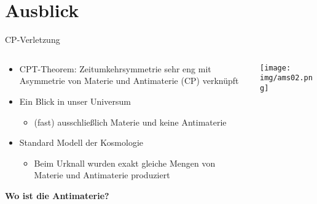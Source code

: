 \section{Ausblick}

\begin{frame}{CP-Verletzung}
    \begin{columns}[T]
        \begin{column}{.6\textwidth}
            \begin{itemize}
                \item CPT-Theorem: Zeitumkehrsymmetrie sehr eng mit Asymmetrie von Materie und Antimaterie (CP) verknüpft
                \item Ein Blick in unser Universum
                \begin{itemize}
                    \item (fast) ausschlie\ss{}lich Materie und keine Antimaterie
                \end{itemize}
                \item Standard Modell der Kosmologie
                \begin{itemize}
                    \item Beim Urknall wurden exakt gleiche Mengen von Materie und Antimaterie produziert
                \end{itemize}
            \end{itemize}
            \centering
            \textbf{Wo ist die Antimaterie?}
        \end{column}
        \begin{column}{.4\textwidth}
            \centering
            \texttt{[image: img/ams02.png]}\\
        \end{column}
    \end{columns}
\end{frame}

